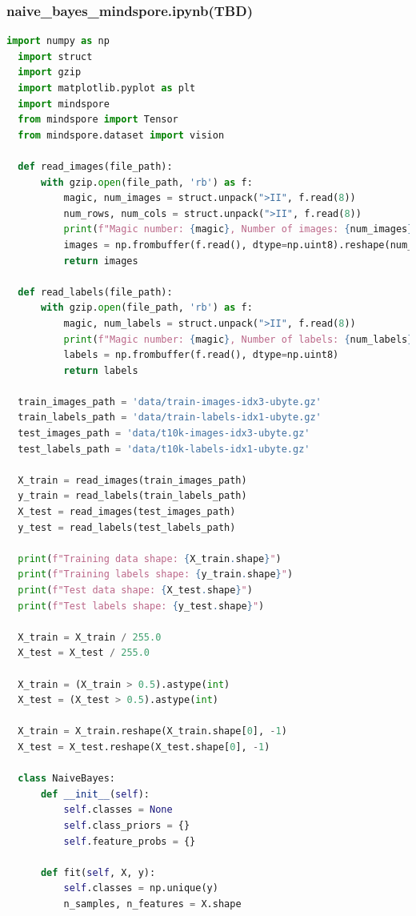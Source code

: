 \documentclass[12pt]{article}
\begin{document}
\subsubsection{naive\_bayes\_mindspore.ipynb(TBD)}
\begin{lstlisting}[language=Python]
  import numpy as np
  import struct
  import gzip
  import matplotlib.pyplot as plt
  import mindspore
  from mindspore import Tensor
  from mindspore.dataset import vision
  
  def read_images(file_path):
      with gzip.open(file_path, 'rb') as f:
          magic, num_images = struct.unpack(">II", f.read(8))
          num_rows, num_cols = struct.unpack(">II", f.read(8))
          print(f"Magic number: {magic}, Number of images: {num_images}, Rows: {num_rows}, Columns: {num_cols}")
          images = np.frombuffer(f.read(), dtype=np.uint8).reshape(num_images, num_rows, num_cols)
          return images
  
  def read_labels(file_path):
      with gzip.open(file_path, 'rb') as f:
          magic, num_labels = struct.unpack(">II", f.read(8))
          print(f"Magic number: {magic}, Number of labels: {num_labels}")
          labels = np.frombuffer(f.read(), dtype=np.uint8)
          return labels
  
  train_images_path = 'data/train-images-idx3-ubyte.gz'
  train_labels_path = 'data/train-labels-idx1-ubyte.gz'
  test_images_path = 'data/t10k-images-idx3-ubyte.gz'
  test_labels_path = 'data/t10k-labels-idx1-ubyte.gz'
  
  X_train = read_images(train_images_path)
  y_train = read_labels(train_labels_path)
  X_test = read_images(test_images_path)
  y_test = read_labels(test_labels_path)
  
  print(f"Training data shape: {X_train.shape}")
  print(f"Training labels shape: {y_train.shape}")
  print(f"Test data shape: {X_test.shape}")
  print(f"Test labels shape: {y_test.shape}")
  
  X_train = X_train / 255.0
  X_test = X_test / 255.0
  
  X_train = (X_train > 0.5).astype(int)
  X_test = (X_test > 0.5).astype(int)
  
  X_train = X_train.reshape(X_train.shape[0], -1)
  X_test = X_test.reshape(X_test.shape[0], -1)
  
  class NaiveBayes:
      def __init__(self):
          self.classes = None
          self.class_priors = {}
          self.feature_probs = {}
  
      def fit(self, X, y):
          self.classes = np.unique(y)
          n_samples, n_features = X.shape
  

\end{lstlisting}
\end{document}
